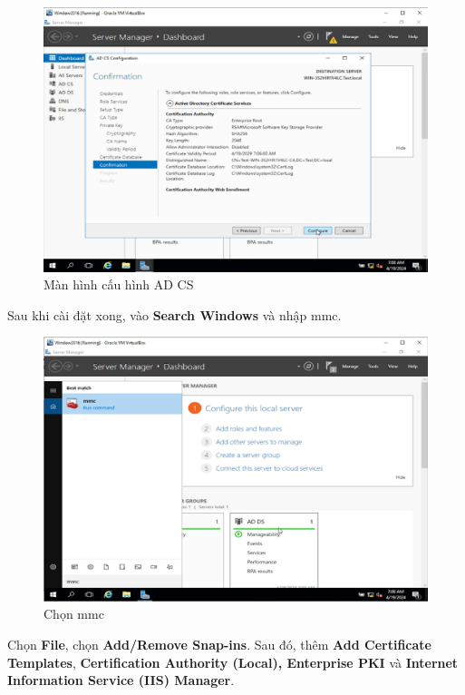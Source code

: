 \begin{figure}[!htb]
    \centering
    \includegraphics[width=0.9\linewidth]{figure//chapter4//lab4_1/configure_window.png}
    \caption{Màn hình cấu hình AD CS}
    \label{fig:enter-label}
\end{figure}

 Sau khi cài đặt xong, vào \textbf{Search Windows} và nhập mmc.

\begin{figure}[!htb]
    \centering
    \includegraphics[width=0.9\linewidth]{figure//chapter4//lab4_1/mmc.png}
    \caption{Chọn mmc}
    \label{fig:enter-label}
\end{figure}

\newpage

 Chọn \textbf{File}, chọn \textbf{Add/Remove Snap-ins}. Sau đó, thêm \textbf{Add Certificate Templates}, \textbf{Certification Authority (Local), Enterprise PKI} và \textbf{Internet Information Service (IIS) Manager}.

